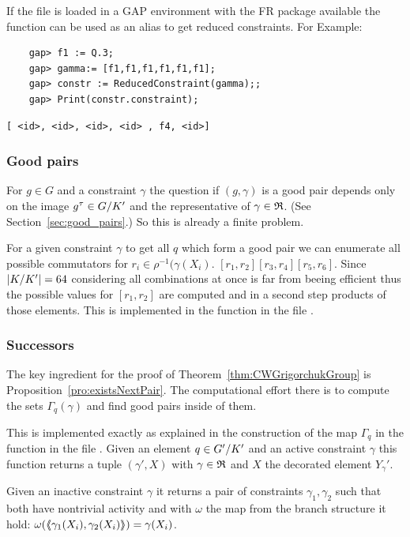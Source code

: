 \documentclass[a4paper,11pt]{amsart}
\begin{document}
If the file  is loaded in a GAP environment with the FR package available 
the function  can be used as an alias to get 
reduced constraints. For Example:
 \begin{lstlisting}
    gap> f1 := Q.3;
    gap> gamma:= [f1,f1,f1,f1,f1,f1];
    gap> constr := ReducedConstraint(gamma);;
    gap> Print(constr.constraint);
\end{lstlisting} 
\begin{verbatim}
[ <id>, <id>, <id>, <id> , f4, <id>]
\end{verbatim} 

\subsubsection{Good pairs}
For $g\in G$ and a constraint $\gamma$ the question if $(g,\gamma)$ is a good
pair depends only on the image $g^\tau\in{G/K'}$ and the representative
of $\gamma\in\mathfrak{R}$. (See Section~\ref{sec:good_pairs}.) So this is already a
finite problem. 

For a given constraint $\gamma$ to get all $q$ which form a good pair we can
enumerate all possible commutators for $r_i\in\rho^{-1}(\gamma(X_i)$.
$[r_1,r_2][r_3,r_4][r_5,r_6]$. Since $\lvert{K/K'}\rvert=64$ considering all 
combinations at once is far from beeing efficient thus the possible values for
$[r_1,r_2]$ are computed and in a second step products of those elements.
This is implemented in the function  in the file
.
\subsubsection{Successors}
The key ingredient for the proof of Theorem~\ref{thm:CWGrigorchukGroup} is
Proposition~\ref{pro:existsNextPair}. The computational effort there is
to compute the sets $\Gamma_q(\gamma)$ and find good pairs inside of them.

This is implemented exactly as explained in the construction of the map
$\Gamma_q$ in the function  in the file 
. Given an element $q\in{G'/K'}$ 
and an active constraint $\gamma$ this function returns a tuple $(\gamma',X)$ 
with $\gamma\in\mathfrak{R}$ and $X$ the decorated element $Y_\gamma'$.

Given an inactive constraint $\gamma$ it returns a pair of constraints
$\gamma_1,\gamma_2$ such that both have nontrivial activity and with
$\omega$ the map from the branch structure it hold:
$\omega(\langle\negthickspace\langle\gamma_1(X_i),\gamma_2(X_i)\rangle\negthickspace\rangle)=\gamma(X_i)$. 
\end{document}
